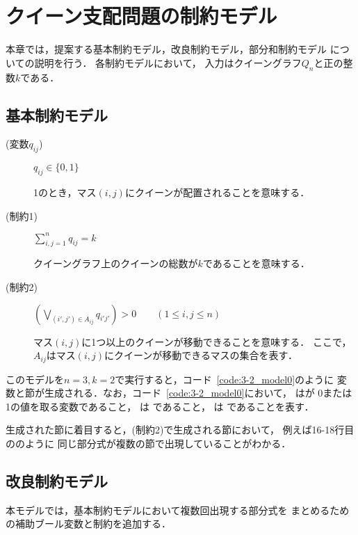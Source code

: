 \chapter{クイーン支配問題の制約モデル}\label{chap:constraint}
本章では，提案する基本制約モデル，改良制約モデル，部分和制約モデル
についての説明を行う．
各制約モデルにおいて，
入力はクイーングラフ$Q_{n}$と正の整数$k$である．

\section{基本制約モデル}
\begin{description}
 \item[(変数$q_{ij}$)] $q_{ij} \in \{0,1\}$ \par
1のとき，マス$(i,j)$にクイーンが配置されることを意味する．
 \item[(制約1)] $\sum\limits_{i,j=1}^{n} q_{ij} = k$ \par
クイーングラフ上のクイーンの総数が$k$であることを意味する．
 \item[(制約2)] $(\bigvee\limits_{(i',j')\in A_{ij}} 
q_{i'j'}) >0 \qquad (1 \leq i,j \leq n)$ \par
マス$(i,j)$に1つ以上のクイーンが移動できることを意味する．
ここで，$A_{ij}$はマス$(i,j)$にクイーンが移動できるマスの集合を表す．
\end{description}

このモデルを$n=3,k=2$で実行すると，コード~\ref{code:3-2_model0}のように
変数と節が生成される．なお，コード~\ref{code:3-2_model0}において，
    はが
0または1の値を取る変数であること，  
は  
であること，  
は  
であることを表す．

生成された節に着目すると，(制約2)で生成される節において，
例えば16-18行目ののように
同じ部分式が複数の節で出現していることがわかる．


\newpage
\section{改良制約モデル}
本モデルでは，基本制約モデルにおいて複数回出現する部分式を
まとめるための補助ブール変数と制約を追加する．

